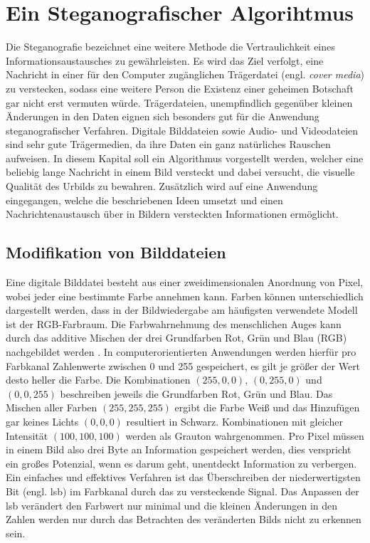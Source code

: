 \chapter{Ein Steganografischer Algorihtmus} \label{cha:steganografie}
Die Steganografie bezeichnet eine weitere Methode die Vertraulichkeit eines
Informationsaustausches zu gewährleisten.
Es wird das Ziel verfolgt, eine Nachricht in einer für den Computer
zugänglichen Trägerdatei (engl. \textit{cover media}) zu verstecken, sodass eine
weitere Person die Existenz
einer geheimen Botschaft gar nicht erst vermuten würde. Trägerdateien, unempfindlich
gegenüber kleinen Änderungen in den Daten eignen sich besonders gut für die
Anwendung steganografischer Verfahren. Digitale Bilddateien sowie Audio- und Videodateien
sind sehr gute Trägermedien,
da ihre Daten ein ganz natürliches Rauschen aufweisen.
In diesem Kapital soll ein Algorithmus vorgestellt werden, welcher
eine beliebig lange Nachricht in einem Bild versteckt und dabei versucht,
die visuelle Qualität des Urbilds zu bewahren.
Zusätzlich wird auf eine Anwendung eingegangen, welche die beschriebenen
Ideen umsetzt und einen Nachrichtenaustausch über
in Bildern versteckten Informationen ermöglicht.

\section{Modifikation von Bilddateien}
Eine digitale Bilddatei besteht aus einer zweidimensionalen Anordnung von Pixel, wobei
jeder eine bestimmte Farbe annehmen kann. Farben können unterschiedlich
dargestellt werden, dass in der Bildwiedergabe am häufigsten verwendete Modell ist
der RGB-Farbraum. Die Farbwahrnehmung des menschlichen Auges kann durch
das additive Mischen der drei Grundfarben Rot, Grün und Blau (RGB)
nachgebildet werden \parencite[32-40]{BOOK:VC}. In computerorientierten Anwendungen
werden hierfür pro Farbkanal Zahlenwerte zwischen 0 und 255 gespeichert,
es gilt je größer der Wert desto heller die Farbe. Die Kombinationen
$(255,0,0)$, $(0,255,0)$ und $(0,0,255)$ beschreiben jeweils die Grundfarben Rot, Grün und Blau.
Das Mischen aller Farben $(255,255,255)$ ergibt die Farbe Weiß und das Hinzufügen
gar keines Lichts $(0,0,0)$ resultiert in Schwarz. Kombinationen mit gleicher Intensität
$(100,100,100)$ werden als Grauton wahrgenommen. Pro Pixel müssen in einem Bild
also drei Byte an Information gespeichert werden, dies verspricht ein großes
Potenzial, wenn es darum geht, unentdeckt Information zu verbergen. Ein
einfaches und effektives Verfahren ist das Überschreiben der niederwertigsten
Bit (engl. \ac{lsb}) im Farbkanal
durch das zu versteckende Signal. Das Anpassen
der \acs{lsb} verändert den Farbwert nur minimal und
die kleinen Änderungen in den Zahlen werden nur durch das
Betrachten des veränderten Bilds nicht zu erkennen sein.

